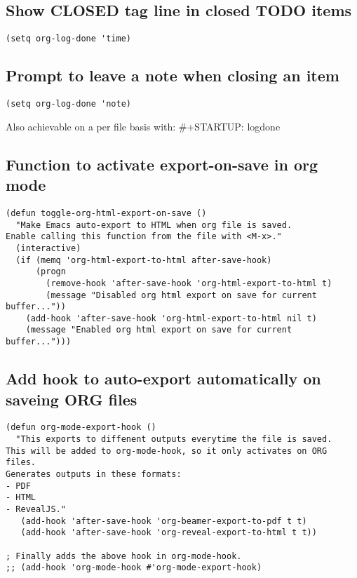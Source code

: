 \documentclass[11pt]{article}
\begin{document}
\subsection*{Show CLOSED tag line in closed TODO items}
\label{sec:orge3fbef0}

\begin{verbatim}
(setq org-log-done 'time)
\end{verbatim}

\subsection*{Prompt to leave a note when closing an item}
\label{sec:orge79888a}
\begin{verbatim}
(setq org-log-done 'note)
\end{verbatim}

\begin{NOTE}
Also achievable on a per file basis with: \#+STARTUP: logdone
\end{NOTE}

\subsection*{Function to activate export-on-save in org mode}
\label{sec:org455d727}

\begin{verbatim}
(defun toggle-org-html-export-on-save ()
  "Make Emacs auto-export to HTML when org file is saved.
Enable calling this function from the file with <M-x>."
  (interactive)
  (if (memq 'org-html-export-to-html after-save-hook)
      (progn
        (remove-hook 'after-save-hook 'org-html-export-to-html t)
        (message "Disabled org html export on save for current buffer..."))
    (add-hook 'after-save-hook 'org-html-export-to-html nil t)
    (message "Enabled org html export on save for current buffer...")))
\end{verbatim}

\subsection*{Add hook to auto-export automatically on saveing ORG files}
\label{sec:org22017a6}

\begin{verbatim}
(defun org-mode-export-hook ()
  "This exports to diffenent outputs everytime the file is saved.
This will be added to org-mode-hook, so it only activates on ORG files.
Generates outputs in these formats:
- PDF
- HTML
- RevealJS."
   (add-hook 'after-save-hook 'org-beamer-export-to-pdf t t)
   (add-hook 'after-save-hook 'org-reveal-export-to-html t t))

; Finally adds the above hook in org-mode-hook.
;; (add-hook 'org-mode-hook #'org-mode-export-hook)
\end{verbatim}
\end{document}
